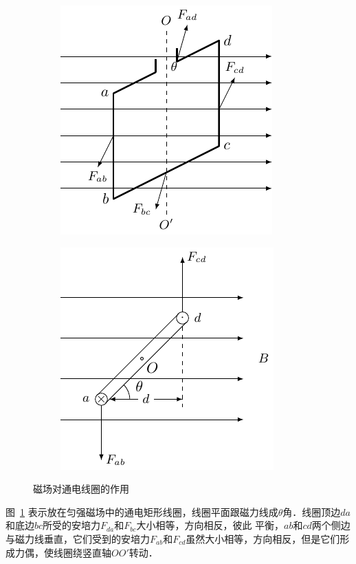 \begin{figure}[htbp]
    \centering
    \begin{subfigure}{0.4\linewidth}
        \centering
        \includegraphics{fig/C/1-30a.pdf}
        \caption{}\label{fig_C_1-30a}
    \end{subfigure}
    \hfil
    \begin{subfigure}{0.4\linewidth}
        \centering
        \includegraphics{fig/C/1-30b.pdf}
        \caption{}\label{fig_C_1-30b}
    \end{subfigure}
    \caption{磁场对通电线圈的作用}\label{fig_C_1-30}
\end{figure}


图~\ref{fig_C_1-30a} 表示放在匀强磁场中的通电矩形线圈，线圈平面跟磁力线成$\theta$角．线圈顶边$da$和底边$bc$所受的安培力$F_{da}$和$F_{bc}$大小相等，方向相反，彼此
平衡，$ab$和$cd$两个侧边与磁力线垂直，它们受到的安培力$F_{ab}$和$F_{cd}$虽然大小相等，方向相反，但是它们形成力偶，使线圈绕竖直轴$OO'$转动．

